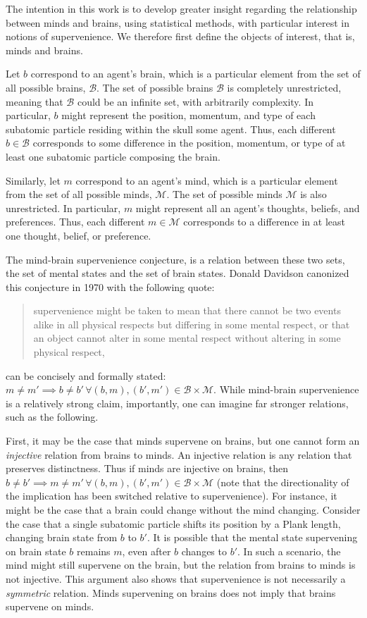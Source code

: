 \documentclass{article}
\newcommand{\mB}{\mathcal{B}}
\newcommand{\mM}{\mathcal{M}}
\begin{document}
The intention in this work is to develop greater insight regarding the relationship between minds and brains, using statistical methods, with particular interest in notions of supervenience.  We therefore first define the objects of interest, that is, minds and brains.

Let $b$ correspond to an agent's brain, which is a particular element from the set of all possible brains, $\mB$.  The set of possible brains $\mB$ is completely unrestricted, meaning that $\mB$ could be an infinite set, with arbitrarily complexity.  In particular, $b$ might represent the position, momentum, and type of each subatomic particle residing within the skull some agent.  Thus, each different $b \in \mB$ corresponds to some difference in the position, momentum, or type of at least one subatomic particle composing the brain.

Similarly, let $m$ correspond to an agent's mind, which is a particular element from the set of all possible minds, $\mM$.  The set of possible minds $\mM$ is also unrestricted. In particular, $m$ might represent all an agent's thoughts, beliefs, and preferences. Thus, each different $m \in \mM$ corresponds to a difference in at least one thought, belief, or preference. 


The mind-brain supervenience conjecture, is a relation between these two sets, the set of mental states and the set of brain states.  Donald Davidson canonized this conjecture in 1970 with the following quote: \cite{Davidson70}
\begin{quotation}
\noindent supervenience might be taken to mean that there cannot be two events alike in all physical respects but differing in some mental respect, or that an object cannot alter in some mental respect without altering in some physical respect,
\end{quotation}
can be concisely and formally stated: $m \neq m' \implies b \neq b' \, \forall (b,m), (b',m') \in \mB \times \mM$.  While mind-brain supervenience is a relatively strong claim, importantly, one can imagine far stronger relations, such as the following.

First, it may be the case that minds supervene on brains, but one cannot form an \emph{injective} relation from brains to minds.  An injective relation is any relation that preserves distinctness.  Thus if minds are injective on brains, then $b\neq b' \implies m \neq m' \, \forall (b,m), (b',m') \in \mB \times \mM$ (note that the directionality of the implication has been switched relative to supervenience). For instance, it might be the case that a brain could change without the mind changing.  Consider the case that a single subatomic particle shifts its position by a Plank length, changing brain state from $b$ to $b'$.  It is possible that the mental state supervening on brain state $b$ remains $m$, even after $b$ changes to $b'$.  In such a scenario, the mind might still supervene on the brain, but the relation from brains to minds is not injective. This argument also shows that supervenience is not necessarily a \emph{symmetric} relation.  Minds supervening on brains does not imply that brains supervene on minds.  
\end{document}
